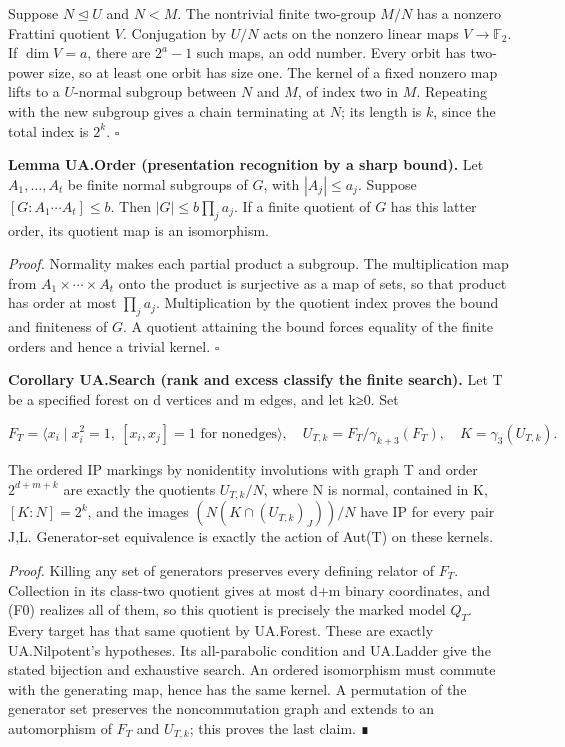 \documentclass[
  11pt,
  a4paper,
]{article}
\begin{document}
Suppose \(N\unlhd U\) and \(N<M\). The nontrivial finite two-group
\(M/N\) has a nonzero Frattini quotient \(V\). Conjugation by \(U/N\)
acts on the nonzero linear maps \(V\to\mathbb F_2\). If \(\dim V=a\),
there are \(2^a-1\) such maps, an odd number. Every orbit has two-power
size, so at least one orbit has size one. The kernel of a fixed nonzero
map lifts to a \(U\)-normal subgroup between \(N\) and \(M\), of index
two in \(M\). Repeating with the new subgroup gives a chain terminating
at \(N\); its length is \(k\), since the total index is \(2^k\).
\(\square\)

\textbf{Lemma UA.Order (presentation recognition by a sharp bound).} Let
\(A_1,\ldots,A_t\) be finite normal subgroups of \(G\), with
\(|A_j|\leq a_j\). Suppose \([G:A_1\cdots A_t]\leq b\). Then
\(|G|\leq b\prod_j a_j\). If a finite quotient of \(G\) has this latter
order, its quotient map is an isomorphism.

\emph{Proof.} Normality makes each partial product a subgroup. The
multiplication map from \(A_1\times\cdots\times A_t\) onto the product
is surjective as a map of sets, so that product has order at most
\(\prod_j a_j\). Multiplication by the quotient index proves the bound
and finiteness of \(G\). A quotient attaining the bound forces equality
of the finite orders and hence a trivial kernel. \(\square\)

\textbf{Corollary UA.Search (rank and excess classify the finite
search).} Let T be a specified forest on d vertices and m edges, and let
k≥0. Set

\[
 F_T=\langle x_i\mid x_i^2=1,\ [x_i,x_j]=1\text{ for nonedges}\rangle,
 \quad U_{T,k}=F_T/\gamma_{k+3}(F_T),\quad K=\gamma_3(U_{T,k}).
\]

The ordered IP markings by nonidentity involutions with graph T and
order \(2^{d+m+k}\) are exactly the quotients \(U_{T,k}/N\), where N is
normal, contained in K, \([K:N]=2^k\), and the images
\((N(K\cap(U_{T,k})_J))/N\) have IP for every pair J,L. Generator-set
equivalence is exactly the action of Aut(T) on these kernels.

\emph{Proof.} Killing any set of generators preserves every defining
relator of \(F_T\). Collection in its class-two quotient gives at most
d+m binary coordinates, and (F0) realizes all of them, so this quotient
is precisely the marked model \(Q_T\). Every target has that same
quotient by UA.Forest. These are exactly UA.Nilpotent's hypotheses. Its
all-parabolic condition and UA.Ladder give the stated bijection and
exhaustive search. An ordered isomorphism must commute with the
generating map, hence has the same kernel. A permutation of the
generator set preserves the noncommutation graph and extends to an
automorphism of \(F_T\) and \(U_{T,k}\); this proves the last claim. ∎
\end{document}
